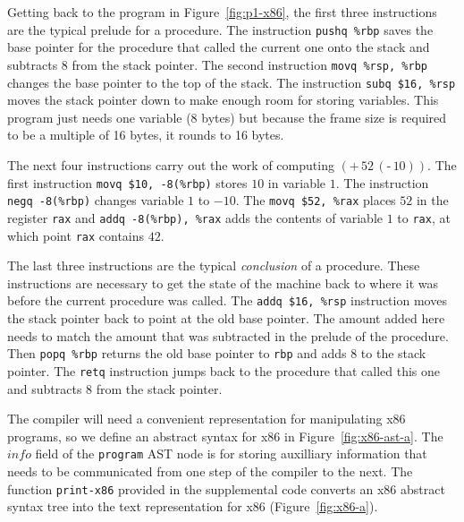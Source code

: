 \documentclass[12pt]{book}
\newcommand{\itm}[1]{\ensuremath{\mathit{#1}}}
\newcommand{\key}[1]{\texttt{#1}}
\newcommand{\UNIOP}[2]{(\key{#1}\,#2)}
\newcommand{\BINOP}[3]{(\key{#1}\,#2\,#3)}
\begin{document}
Getting back to the program in Figure~\ref{fig:p1-x86}, the first
three instructions are the typical prelude for a procedure.  The
instruction \key{pushq \%rbp} saves the base pointer for the procedure
that called the current one onto the stack and subtracts $8$ from the
stack pointer. The second instruction \key{movq \%rsp, \%rbp} changes
the base pointer to the top of the stack. The instruction \key{subq
  \$16, \%rsp} moves the stack pointer down to make enough room for
storing variables.  This program just needs one variable ($8$ bytes)
but because the frame size is required to be a multiple of 16 bytes,
it rounds to 16 bytes.

The next four instructions carry out the work of computing
$\BINOP{+}{52}{\UNIOP{-}{10} }$. The first instruction \key{movq \$10,
  -8(\%rbp)} stores $10$ in variable $1$. The instruction \key{negq
  -8(\%rbp)} changes variable $1$ to $-10$. The \key{movq \$52, \%rax}
places $52$ in the register \key{rax} and \key{addq -8(\%rbp), \%rax}
adds the contents of variable $1$ to \key{rax}, at which point
\key{rax} contains $42$.

The last three instructions are the typical \emph{conclusion} of a
procedure. These instructions are necessary to get the state of the
machine back to where it was before the current procedure was called.
The \key{addq \$16, \%rsp} instruction moves the stack pointer back to
point at the old base pointer. The amount added here needs to match
the amount that was subtracted in the prelude of the procedure.  Then
\key{popq \%rbp} returns the old base pointer to \key{rbp} and adds
$8$ to the stack pointer.  The \key{retq} instruction jumps back to
the procedure that called this one and subtracts 8 from the stack
pointer.

The compiler will need a convenient representation for manipulating
x86 programs, so we define an abstract syntax for x86 in
Figure~\ref{fig:x86-ast-a}. The \itm{info} field of the \key{program}
AST node is for storing auxilliary information that needs to be
communicated from one step of the compiler to the next. The function
\key{print-x86} provided in the supplemental code converts an x86
abstract syntax tree into the text representation for x86
(Figure~\ref{fig:x86-a}).
\end{document}
